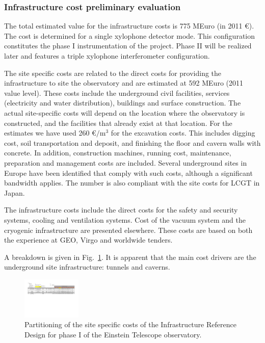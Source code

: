 \subsubsection[Site costs]{Infrastructure cost preliminary evaluation}
%  
\label{ConclusionsSiteCostsSubSection}
%
The total estimated value for the infrastructure costs is 775 MEuro (in 2011 \euro). The cost is determined for a single xylophone detector mode. This configuration constitutes the phase I instrumentation of the project. Phase II will be realized later and features a triple xylophone interferometer configuration.

The site specific costs are related to the direct costs for providing the infrastructure to site the observatory and are estimated at 592 MEuro (2011 value level). These costs include the underground civil facilities, services (electricity and water distribution), buildings and surface construction. The actual site-specific costs will depend on the location where the observatory is constructed, and the facilities that already exist at that location. For the estimates we have used 260 \euro $/ \mathrm{m^3}$ for the excavation costs. This includes digging cost, soil transportation and deposit, and finishing the floor and cavern walls with concrete. In addition, construction machines, running cost, maintenance, preparation and management costs are included. Several underground sites in Europe have been identified that comply with such costs, although a significant bandwidth applies. The number is also compliant with the site costs for LCGT in Japan.

The infrastructure costs include the direct costs for the safety and security systems, cooling and ventilation systems. Cost of the vacuum system and the cryogenic infrastructure are presented elsewhere. These costs are based on both the experience at GEO, Virgo and worldwide tenders.
 

A breakdown is given in Fig.~\ref{fig:etcost2}. It is apparent that the main cost drivers are the underground site infrastructure: tunnels and caverns. 
\FloatBarrier
\begin{figure}[htbp]
	\begin{center}
\includegraphics[angle=90, width=0.25\textwidth]{Sec_Conclusions/ET-cost-v00r05-Site.pdf}		\caption{Partitioning of the site specific costs of the Infrastructure Reference Design for phase I of the Einstein Telescope observatory.}
		\label{fig:etcost2}
	\end{center}
\end{figure}


